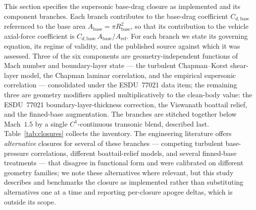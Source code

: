 \label{sec:basedrag-models}

This section specifies the supersonic base-drag closure as implemented and its
component branches. Each branch contributes to the base-drag coefficient
$C_{d,\text{base}}$ referenced to the base area
$A_{\text{base}} = \pi R_{\text{base}}^{2}$, so that its contribution to the
vehicle axial-force coefficient is $C_{d,\text{base}}\,A_{\text{base}}/A_{\text{ref}}$.
For each branch we state its governing equation, its regime of validity, and the
published source against which it was assessed. Three of the six components are
geometry-independent functions of Mach number and boundary-layer state --- the
turbulent Chapman--Korst shear-layer model, the Chapman laminar correlation, and
the empirical supersonic correlation --- consolidated under the ESDU~77021 data
item; the remaining three are geometry modifiers applied multiplicatively to the
clean-body value: the ESDU~77021 boundary-layer-thickness correction, the
Viswanath boattail relief, and the finned-base augmentation. The branches are
stitched together below Mach~$1.5$ by a single $C^{1}$-continuous transonic
blend, described last. Table~\ref{tab:closures} collects the inventory. The
engineering literature offers \emph{alternative} closures for several of these
branches --- competing turbulent base-pressure correlations, different
boattail-relief models, and several finned-base treatments --- that disagree in
functional form and were calibrated on different geometry families; we note these
alternatives where relevant, but this study describes and benchmarks the closure
as implemented rather than substituting alternatives one at a time and reporting
per-closure apogee deltas, which is outside its scope.

